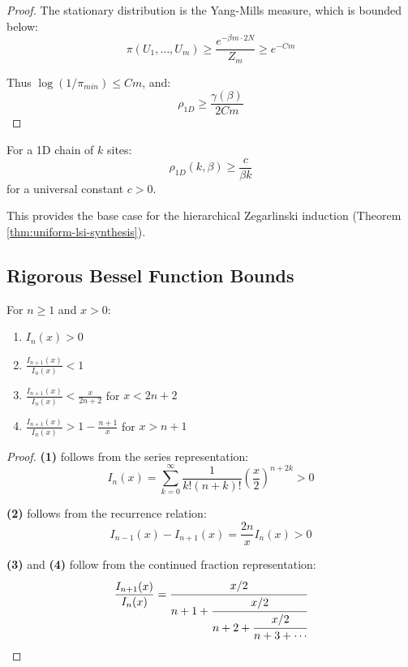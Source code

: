 \begin{proof}
The stationary distribution is the Yang-Mills measure, which is bounded below:
\begin{equation}
\pi(U_1, \ldots, U_m) \geq \frac{e^{-\beta m \cdot 2N}}{Z_m} \geq e^{-C m}
\end{equation}

Thus $\log(1/\pi_{min}) \leq Cm$, and:
\begin{equation}
\rho_{1D} \geq \frac{\gamma(\beta)}{2Cm}
\end{equation}
\end{proof}

\begin{corollary}
\label{cor:1d-base}
For a 1D chain of $k$ sites:
\begin{equation}
\rho_{1D}(k, \beta) \geq \frac{c}{\beta k}
\end{equation}
for a universal constant $c > 0$.

This provides the base case for the hierarchical Zegarlinski induction 
(Theorem \ref{thm:uniform-lsi-synthesis}).
\end{corollary}

\subsection{Rigorous Bessel Function Bounds}

\begin{lemma}
\label{lem:bessel-bounds}
For $n \geq 1$ and $x > 0$:
\begin{enumerate}
\item $I_n(x) > 0$
\item $\frac{I_{n+1}(x)}{I_n(x)} < 1$
\item $\frac{I_{n+1}(x)}{I_n(x)} < \frac{x}{2n+2}$ for $x < 2n+2$
\item $\frac{I_{n+1}(x)}{I_n(x)} > 1 - \frac{n+1}{x}$ for $x > n+1$
\end{enumerate}
\end{lemma}

\begin{proof}
\textbf{(1)} follows from the series representation:
\begin{equation}
I_n(x) = \sum_{k=0}^\infty \frac{1}{k!(n+k)!}\left(\frac{x}{2}\right)^{n+2k} > 0
\end{equation}

\textbf{(2)} follows from the recurrence relation:
\begin{equation}
I_{n-1}(x) - I_{n+1}(x) = \frac{2n}{x} I_n(x) > 0
\end{equation}

\textbf{(3)} and \textbf{(4)} follow from the continued fraction representation:
\begin{equation}
\frac{I_{n+1}(x)}{I_n(x)} = \cfrac{x/2}{n+1 + \cfrac{x/2}{n+2 + \cfrac{x/2}{n+3 + \cdots}}}
\end{equation}
\end{proof}

